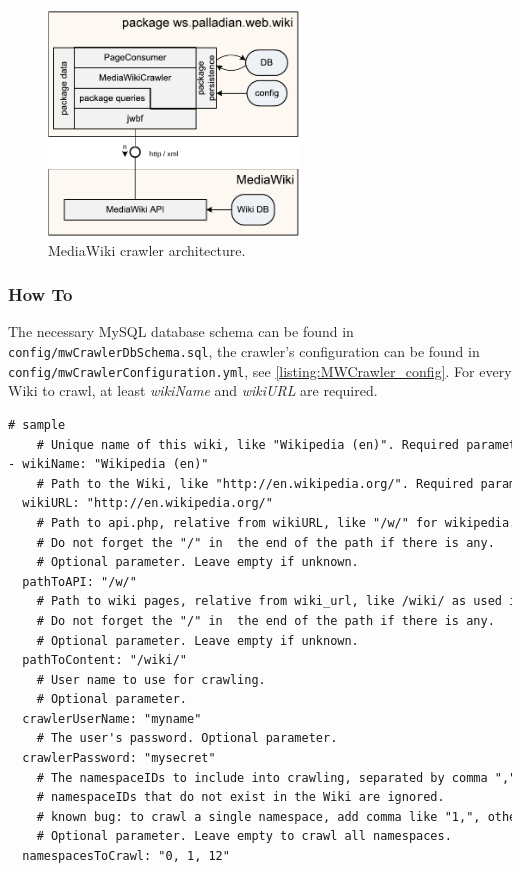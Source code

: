 \documentclass[a4paper,twoside]{book}      %
\begin{document}
\begin{figure}[ht!]
\centering
\includegraphics[width=0.6\textwidth]{img/MediaWiki_Crawler_Architecture.pdf}
\caption{MediaWiki crawler architecture.}
\label{fig:MWCrawler-architecture}
\end{figure}

\subsubsection{How To}
The necessary MySQL database schema can be found in \texttt{config/mwCrawlerDbSchema.sql}, the crawler's configuration can be found in \texttt{config/mwCrawlerConfiguration.yml}, see \ref{listing:MWCrawler_config}. For every Wiki to crawl, at least \emph{wikiName} and \emph{wikiURL} are required.

\begin{codelisting}
\begin{lstlisting}[caption=MediaWiki crawler configuration.,frame=tb,language=tex,breaklines=true,label=listing:MWCrawler_config]
# sample
    # Unique name of this wiki, like "Wikipedia (en)". Required parameter.
- wikiName: "Wikipedia (en)"
    # Path to the Wiki, like "http://en.wikipedia.org/". Required parameter.
  wikiURL: "http://en.wikipedia.org/"
    # Path to api.php, relative from wikiURL, like "/w/" for wikipedia. Must not contain the file name api.php.
    # Do not forget the "/" in  the end of the path if there is any.
    # Optional parameter. Leave empty if unknown. 		
  pathToAPI: "/w/" 
    # Path to wiki pages, relative from wiki_url, like /wiki/ as used in wikipedia (resulting path is http://de.wikipedia.org/wiki/).         
    # Do not forget the "/" in  the end of the path if there is any. 
    # Optional parameter. Leave empty if unknown.
  pathToContent: "/wiki/"
    # User name to use for crawling.
    # Optional parameter. 
  crawlerUserName: "myname" 
    # The user's password. Optional parameter. 
  crawlerPassword: "mysecret"
    # The namespaceIDs to include into crawling, separated by comma ",". All pages within these namespaces are crawled.
    # namespaceIDs that do not exist in the Wiki are ignored.
    # known bug: to crawl a single namespace, add comma like "1,", otherwise all namespaces are crawled! 
    # Optional parameter. Leave empty to crawl all namespaces.
  namespacesToCrawl: "0, 1, 12" 
\end{lstlisting}
\end{codelisting}
\end{document}
